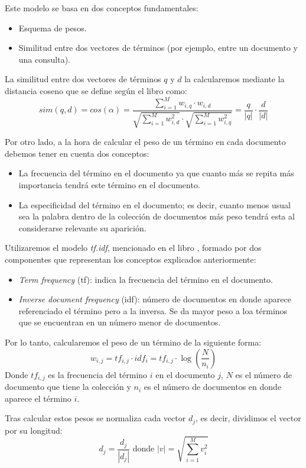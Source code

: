 \documentclass[size=a4, parskip=half, titlepage=false, toc=flat, toc=bib, 12pt]{scrartcl}
\theoremstyle{theorem-style}
\theoremstyle{definition-style}
\theoremstyle{remark-style}
\theoremstyle{example-style}
\theoremstyle{definition-style}
\theoremstyle{remark-style}
\begin{document}
Este modelo se basa en dos conceptos fundamentales:
\begin{itemize}
\item Esquema de pesos.
\item Similitud entre dos vectores de términos (por ejemplo, entre un documento y una consulta).
\end{itemize}
La similitud entre dos vectores de términos $q$ y $d$ la calcularemos mediante la distancia coseno que se define según el libro \cite{ri} como:
$$sim(q,d) = cos(\alpha) = \frac{\sum_{i = 1}^M w_{i,q} \cdot w_{i,d}}{\sqrt{\sum_{i = 1}^M w_{i,d}^2} \cdot \sqrt{\sum_{i = 1}^M w_{i,q}^2}} = \frac{q}{|q|} \cdot \frac{d}{|d|} $$

Por otro lado, a la hora de calcular el peso de un término en cada documento debemos tener en cuenta dos conceptos:
\begin{itemize}
\item La frecuencia del término en el documento ya que cuanto más se repita más importancia tendrá este término en el documento.
\item La especificidad del término en el documento; es decir, cuanto menos usual sea la palabra dentro de la colección de documentos más peso tendrá esta al considerarse relevante su aparición.
\end{itemize}
Utilizaremos el modelo \textit{tf.idf}, mencionado en el libro \cite{ri},  formado por dos componentes que representan los conceptos explicados anteriormente:
\begin{itemize}
\item \textit{Term frequency} (tf): indica la frecuencia del término en el documento.
\item \textit{Inverse document frequency} (idf): número de documentos en donde aparece referenciado el término pero a la inversa. Se da mayor peso a loa términos que se encuentran en un número menor de documentos.
\end{itemize}

Por lo tanto, calcularemos el peso de un término de la siguiente forma:
$$w_{i,j} = tf_{i,j} \cdot idf_i = tf_{i,j} \cdot \log \left(\frac{N}{n_i} \right) $$
Donde $tf_{i,j}$ es la frecuencia del término $i$ en el documento $j$, $N$ es el número de documento que tiene la colección y $n_i$ es el número de documentos en donde aparece el término $i$.

Tras calcular estos pesos se normaliza cada vector $d_j$, es decir, dividimos el vector por su longitud:
$$d_j = \frac{d_j}{|d_j|} \textrm{ donde } |v| = \sqrt{\sum_{i = 1}^M v_i^2} $$
\end{document}
